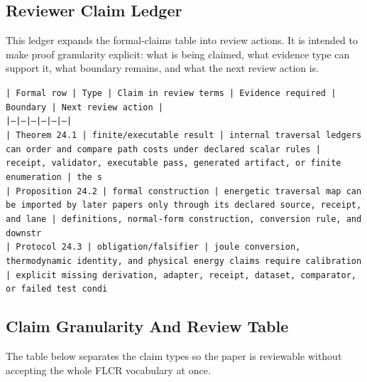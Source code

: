 \documentclass[11pt]{article}
\begin{document}
\subsection*{Reviewer Claim Ledger}

This ledger expands the formal-claims table into review actions. It is intended to make proof granularity explicit: what is being claimed, what evidence type can support it, what boundary remains, and what the next review action is.

\noindent\texttt{| Formal row | Type | Claim in review terms | Evidence required | Boundary | Next review action |}\\
\noindent\texttt{|---|---|---|---|---|---|}\\
\noindent\texttt{| Theorem 24.1 | finite/executable result | internal traversal ledgers can order and compare path costs under declared scalar rules | receipt, validator, executable pass, generated artifact, or finite enumeration | the s}\\
\noindent\texttt{| Proposition 24.2 | formal construction | energetic traversal map can be imported by later papers only through its declared source, receipt, and lane | definitions, normal-form construction, conversion rule, and downstr}\\
\noindent\texttt{| Protocol 24.3 | obligation/falsifier | joule conversion, thermodynamic identity, and physical energy claims require calibration | explicit missing derivation, adapter, receipt, dataset, comparator, or failed test condi}\\

\subsection*{Claim Granularity And Review Table}

The table below separates the claim types so the paper is reviewable without accepting the whole FLCR vocabulary at once.
\end{document}
